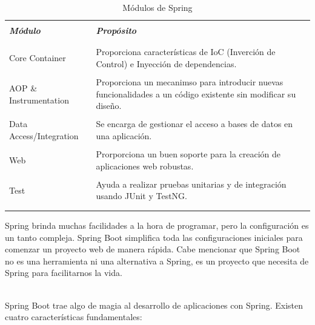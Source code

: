 			\begin{table}[H]
				\begin{tabular}{|p{4.75cm}|p{12cm}|} \hline
					 & \\
					\textit{\bfseries Módulo} & \textit{\bfseries Propósito} \\
					 & \\ \hline
					 
					 & \\
					Core Container & Proporciona características de IoC (Inverción de Control)
					e Inyección de dependencias.\\
					 & \\
					 
					AOP \& Instrumentation & Proporciona un mecanimso para introducir nuevas
					funcionalidades a un código existente sin modificar su diseño.\\
					& \\
					
					Data Access/Integration & Se encarga de gestionar el acceso a bases de
					datos en una aplicación.\\
					& \\
					
					Web & Prorporciona un buen soporte para la creación de aplicaciones web
					robustas.\\
					& \\
					
					Test & Ayuda a realizar pruebas unitarias y de integración usando JUnit y
					TestNG.\\
					& \\
					
					& \\ \hline
				\end{tabular}
				\caption{Módulos de Spring}
			\end{table}
			
			
			
		
		Spring brinda muchas facilidades a la hora de programar, pero la
		configuración es un tanto compleja. Spring Boot simplifica toda las
		configuraciones iniciales para comenzar un proyecto web de manera rápida.
		Cabe mencionar que Spring Boot no es una herramienta ni una alternativa a Spring,
		es un proyecto que necesita de Spring para facilitarnos la vida.\\\
		
		Spring Boot trae algo de magia al desarrollo de aplicaciones con Spring.
		Existen cuatro características fundamentales:
		
